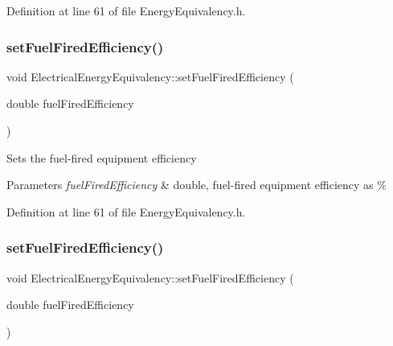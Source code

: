Definition at line 61 of file Energy\+Equivalency.\+h.

\mbox{\label{class_electrical_energy_equivalency_ac73a4dadfeeff737a24b58e805ce9a3a}} 
\subsubsection{\texorpdfstring{set\+Fuel\+Fired\+Efficiency()}{setFuelFiredEfficiency()}\hspace{0.1cm}{\footnotesize\ttfamily [2/3]}}
{\footnotesize\ttfamily void Electrical\+Energy\+Equivalency\+::set\+Fuel\+Fired\+Efficiency (\begin{DoxyParamCaption}\item[{double}]{fuel\+Fired\+Efficiency }\end{DoxyParamCaption})\hspace{0.3cm}{\ttfamily [inline]}}

Sets the fuel-\/fired equipment efficiency


\begin{DoxyParams}{Parameters}
{\em fuel\+Fired\+Efficiency} & double, fuel-\/fired equipment efficiency as \% \\
\hline
\end{DoxyParams}


Definition at line 61 of file Energy\+Equivalency.\+h.

\mbox{\label{class_electrical_energy_equivalency_ac73a4dadfeeff737a24b58e805ce9a3a}} 
\subsubsection{\texorpdfstring{set\+Fuel\+Fired\+Efficiency()}{setFuelFiredEfficiency()}\hspace{0.1cm}{\footnotesize\ttfamily [3/3]}}
{\footnotesize\ttfamily void Electrical\+Energy\+Equivalency\+::set\+Fuel\+Fired\+Efficiency (\begin{DoxyParamCaption}\item[{double}]{fuel\+Fired\+Efficiency }\end{DoxyParamCaption})\hspace{0.3cm}{\ttfamily [inline]}}

